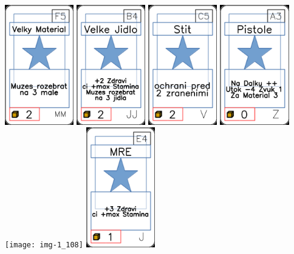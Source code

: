 \documentclass[a4paper]{article}
\begin{document}
	\includegraphics[width=3.0cm]{img-1_59}
	\includegraphics[width=3.0cm]{img-1_38}
	\includegraphics[width=3.0cm]{img-1_74}
	\includegraphics[width=3.0cm]{img-1_92}
	\texttt{[image: img-1\_108]}
	\includegraphics[width=3.0cm]{img-1_23}
\end{document}

